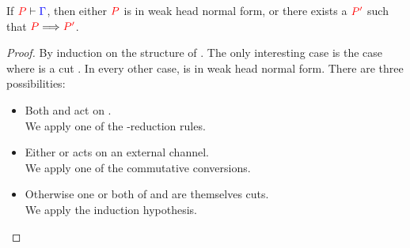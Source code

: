 \begin{theorem}\label{thm:cp-progress-1}
  If $\seq[{ P }]{ \Gamma }$, then either $\tm{P}$ is in weak head normal form,
  or there exists a $\tm{P'}$ such that $\reducesto{P}{P'}$.
\end{theorem}
\begin{proof}
  By induction on the structure of . The only interesting case is the
  case where  is a cut . In every other case,
   is in weak head normal form. There are three possibilities:
  \begin{itemize}
  \item
    Both  and  act on .
    \\
    We apply one of the \textbeta-reduction rules.
  \item
    Either  or  acts on an external channel.
    \\
    We apply one of the commutative conversions.
  \item
    Otherwise one or both of  and  are themselves cuts.
    \\
    We apply the induction hypothesis.
  \end{itemize}
\end{proof}
  